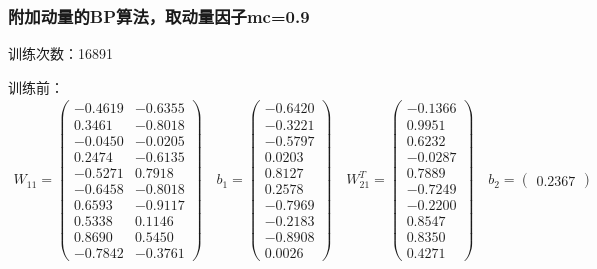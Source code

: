 \documentclass[UTF8]{article}
\begin{document}
\subsubsection{附加动量的BP算法，取动量因子mc=0.9}
训练次数：16891

训练前：
\begin{equation}
\nonumber
\begin{aligned}
    W_{11} = 
    \left(
    \begin{matrix}
        -0.4619& -0.6355\\
        0.3461 &  -0.8018\\
        -0.0450 &  -0.0205\\
        0.2474  & -0.6135\\
        -0.5271&    0.7918\\
        -0.6458  & -0.8018\\
        0.6593  & -0.9117\\
        0.5338  &  0.1146\\
        0.8690 &   0.5450\\
        -0.7842 &  -0.3761
    \end{matrix}
    \right)
    \quad
    b_{1} = 
    \left(
    \begin{matrix}
        -0.6420\\
        -0.3221\\
        -0.5797\\
        0.0203\\
        0.8127\\
        0.2578\\
        -0.7969\\
        -0.2183\\
        -0.8908\\
        0.0026
    \end{matrix}
    \right)
    \quad
    W_{21}^T = 
    \left(
    \begin{matrix}
        -0.1366 \\ 0.9951 \\ 0.6232 \\ -0.0287\\ 0.7889 \\-0.7249 \\-0.2200 \\ 0.8547 \\0.8350 \\0.4271
    \end{matrix}
    \right)
    \quad
    b_{2} = 
    \left(
    \begin{matrix}
        0.2367
    \end{matrix}
    \right)
\end{aligned}
\end{equation}
\end{document}
